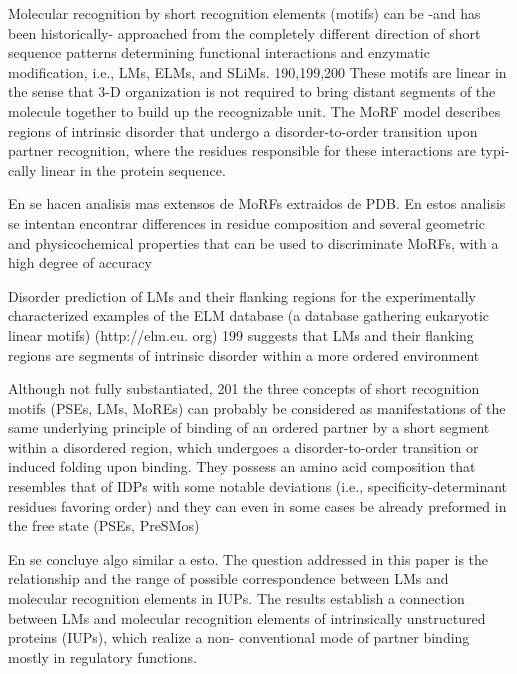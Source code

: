 Molecular recognition by short recognition elements (motifs)
can be -and has been historically- approached from the
completely different direction of short sequence patterns
determining functional interactions and enzymatic modification,
i.e., LMs, ELMs, and SLiMs. 190,199,200 These motifs are linear in
the sense that 3-D organization is not required to bring distant
segments of the molecule together to build up the recognizable
unit.
The MoRF model describes regions
of intrinsic disorder that undergo a disorder-to-order
transition upon partner recognition, where the
residues responsible for these interactions are typi-
cally linear in the protein sequence.

En \cite{mohan2006analysis,vacic2007characterization} se hacen analisis mas extensos de MoRFs extraidos de PDB.
En estos analisis se intentan encontrar differences in residue composition and several geometric and physicochemical properties that can be used to discriminate MoRFs, with a high degree of accuracy


Disorder prediction of LMs and their flanking regions for
the experimentally characterized examples of the ELM database
(a database gathering eukaryotic linear motifs) (http://elm.eu.
org) 199 suggests that LMs and their flanking regions are segments
of intrinsic disorder within a more ordered environment



Although not fully substantiated, 201 the three concepts of short
recognition motifs (PSEs, LMs, MoREs) can probably be
considered as manifestations of the same underlying principle of
binding of an ordered partner by a short segment within a
disordered region, which undergoes a disorder-to-order
transition or induced folding upon binding.
They possess an
amino acid composition that resembles that of IDPs with some
notable deviations (i.e., specificity-determinant residues favoring
order) and they can even in some cases be already preformed in
the free state (PSEs, PreSMos)

En \cite{fuxreiter2007local} se concluye algo similar a esto.
The question addressed in
this paper is the relationship and the range of possible
correspondence between LMs and molecular recognition
elements in IUPs.
The results establish a
connection between LMs and molecular recognition elements of
intrinsically unstructured proteins (IUPs), which realize a non-
conventional mode of partner binding mostly in regulatory functions.

